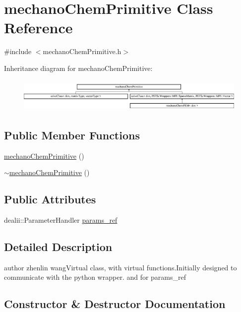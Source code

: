 \section{mechano\+Chem\+Primitive Class Reference}
\label{classmechano_chem_primitive}


{\ttfamily \#include $<$mechano\+Chem\+Primitive.\+h$>$}

Inheritance diagram for mechano\+Chem\+Primitive\+:\begin{figure}[H]
\begin{center}
\leavevmode
\includegraphics[height=1.650295cm]{classmechano_chem_primitive}
\end{center}
\end{figure}
\subsection*{Public Member Functions}
\begin{DoxyCompactItemize}
\item 
\mbox{\hyperlink{classmechano_chem_primitive_a3c34d5e567d1187c409a4337289760ee}{mechano\+Chem\+Primitive}} ()
\item 
\mbox{\hyperlink{classmechano_chem_primitive_a75af109e7881383b100372d5c9121ee9}{$\sim$mechano\+Chem\+Primitive}} ()
\end{DoxyCompactItemize}
\subsection*{Public Attributes}
\begin{DoxyCompactItemize}
\item 
dealii\+::\+Parameter\+Handler \mbox{\hyperlink{classmechano_chem_primitive_a346c15877bf81bdb4fd274d71a73d7da}{params\+\_\+ref}}
\end{DoxyCompactItemize}


\subsection{Detailed Description}
author zhenlin wang\+Virtual class, with virtual functions.\+Initially designed to communicate with the python wrapper. and for params\+\_\+ref 

\subsection{Constructor \& Destructor Documentation}
\mbox{\label{classmechano_chem_primitive_a3c34d5e567d1187c409a4337289760ee}} 
